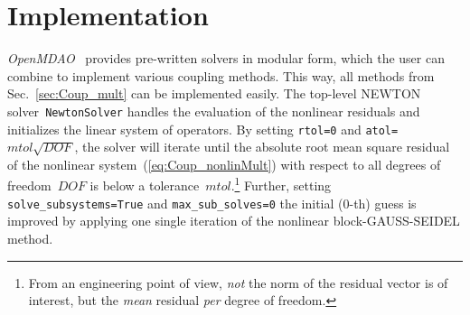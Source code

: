 \documentclass[10pt, ngerman, english,
twoside, open=right,
numbers=noenddot,
declaration=section,
abstract=section,
abstract=multiple,
abstract=notoc,
declaration=notoc,
cd=pale, 
chapterprefix=off, 
chapterpage=false, 
headingsvskip=-10em,
cdgeometry=custom, 
slantedgreek=on,
cdmath=on, 
cdfont=on,
ttfont=false,
mathswap=off,
]{tudscrreprt}
\numberwithin{equation}{chapter}
\renewcommand{\textsc}[1]{\uppercase{\mbox{#1}}}
\newcommand{\sidenote}[1]{
  \leavevmode %
  \marginpar{\hyphenpenalty=1000 \flushleft{\textcolor{HKS41}{#1}}}}
\begin{document}
\section{Implementation}\label{sec:Coup_impl}
\sidenote{Top-Level Solvers}\textit{OpenMDAO}~\cite{OpenMDAO, OpenMDAODoc} provides pre-written solvers in modular form, which the user can combine to implement various coupling methods. This way, all methods from Sec.~\ref{sec:Coup_mult} can be implemented easily.
The top-level \textsc{Newton} solver~\texttt{NewtonSolver} handles the evaluation of the nonlinear residuals and initializes the linear system of operators. By setting \texttt{rtol=0} and \texttt{atol=$mtol\sqrt{DOF}$}, the solver will iterate until the absolute root mean square residual of the nonlinear system~(\ref{eq:Coup_nonlinMult}) with respect to all degrees of freedom~$DOF$ is below a tolerance~$mtol$.\footnote{From an engineering point of view, \emph{not} the norm of the residual vector is of interest, but the \emph{mean} residual \emph{per} degree of freedom.} Further, setting \texttt{solve\_subsystems=True} and \texttt{max\_sub\_solves=0} the initial (0-th) guess is improved by applying one single iteration of the nonlinear block-\textsc{Gau\ss}-\textsc{Seidel} method. 
\end{document}
